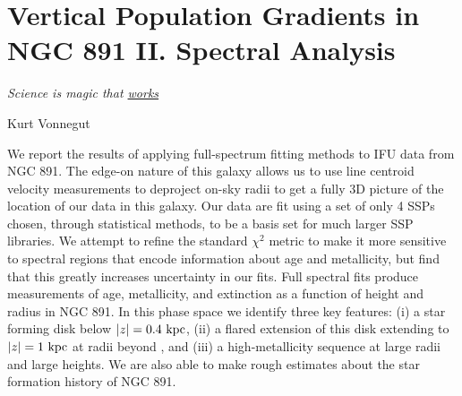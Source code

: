 
\chapter[NGC 891: Full Spectrum Analysis]{Vertical Population Gradients in NGC 891 II. Spectral Analysis}
\label{chap:891_2}
\epigraph{\fixspacing\emph{Science is magic that \underline{works}}}{Kurt Vonnegut}

\cleardoublepage

\begin{chabstract}

  We report the results of applying full-spectrum fitting methods to
  IFU data from NGC 891. The edge-on nature of this galaxy allows us
  to use line centroid velocity measurements to deproject on-sky radii
  to get a fully 3D picture of the location of our data in this
  galaxy. Our data are fit using a set of only 4 SSPs chosen, through
  statistical methods, to be a basis set for much larger SSP
  libraries. We attempt to refine the standard $\chi^2$ metric to make
  it more sensitive to spectral regions that encode information about
  age and metallicity, but find that this greatly increases
  uncertainty in our fits. Full spectral fits produce measurements of
  age, metallicity, and extinction as a function of height and radius
  in NGC 891. In this phase space we identify three key features: (i)
  a star forming disk below $|z| = 0.4~\mathrm{kpc} $, (ii) a flared
  extension of this disk extending to $|z| = 1~\mathrm{kpc} $ at radii
  beyond , and (iii) a high-metallicity sequence at large
  radii and large heights. We are also able to make rough estimates
  about the star formation history of NGC 891.



\end{chabstract}

